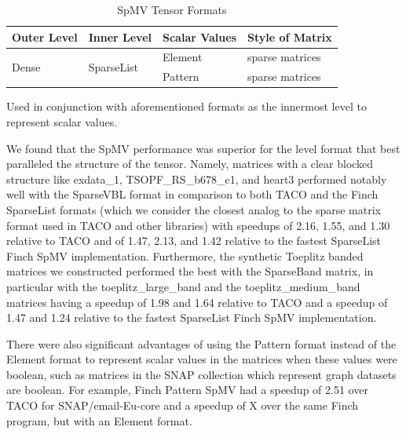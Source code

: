 \begin{table}[htbp]
    \centering
    \caption{SpMV Tensor Formats}
    \begin{tabular}{|l|l|l|l|}
        \hline
        \textbf{Outer Level} & \textbf{Inner Level} & \textbf{Scalar Values} & \textbf{Style of Matrix}\\
        \hline
        \multirow{2}{*}{Dense} & \multirow{2}{*}{SparseList} & Element & sparse matrices \\
        \cline{3-5} 
        & & Pattern & sparse matrices \\
        \hline 
    \end{tabular}
    \footnotesize *Used in conjunction with aforementioned formats as the innermost level to represent scalar values.
\end{table}

We found that the SpMV performance was superior for the level format that best paralleled the structure of the tensor. Namely, matrices with a clear blocked structure like exdata\_1, TSOPF\_RS\_b678\_c1, and heart3 performed notably well with the SparseVBL format in comparison to both TACO and the Finch SparseList formats (which we consider the closest analog to the sparse matrix format used in TACO and other libraries) with speedups of 2.16, 1.55, and 1.30 relative to TACO and of 1.47, 2.13, and 1.42 relative to the fastest SparseList Finch SpMV implementation. Furthermore, the synthetic Toeplitz banded matrices we constructed performed the best with the SparseBand matrix, in particular with the toeplitz\_large\_band and the toeplitz\_medium\_band matrices having a speedup of 1.98 and 1.64 relative to TACO and a speedup of 1.47 and 1.24 relative to the fastest SparseList Finch SpMV implementation. 

There were also significant advantages of using the Pattern format instead of the Element format to represent scalar values in the matrices when these values were boolean, such as matrices in the SNAP collection which represent graph datasets are boolean. For example, Finch Pattern SpMV had a speedup of 2.51 over TACO for SNAP/email-Eu-core and a speedup of X over the same Finch program, but with an Element format.   


